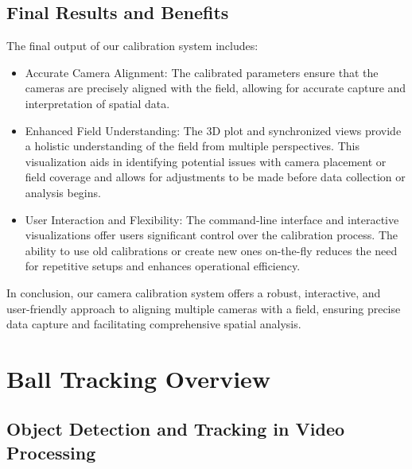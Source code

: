 \documentclass{template}
\begin{document}
\section{Final Results and Benefits}
The final output of our calibration system includes:
\begin{itemize}
    \item Accurate Camera Alignment: The calibrated parameters ensure that the cameras are precisely aligned with the field, allowing for accurate capture and interpretation of spatial data.
    \item Enhanced Field Understanding: The 3D plot and synchronized views provide a holistic understanding of the field from multiple perspectives. This visualization aids in identifying potential issues with camera placement or field coverage and allows for adjustments to be made before data collection or analysis begins.
    \item User Interaction and Flexibility: The command-line interface and interactive visualizations offer users significant control over the calibration process. The ability to use old calibrations or create new ones on-the-fly reduces the need for repetitive setups and enhances operational efficiency.
\end{itemize}
In conclusion, our camera calibration system offers a robust, interactive, and user-friendly approach to aligning multiple cameras with a field, ensuring precise data capture and facilitating comprehensive spatial analysis.

\chapter{Ball Tracking Overview}
\section{Object Detection and Tracking in Video Processing}
\end{document}
